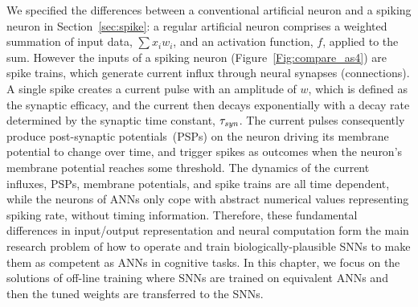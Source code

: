 	We specified the differences between a conventional artificial neuron and a spiking neuron in Section~\ref{sec:spike}: a regular artificial neuron comprises a weighted summation of input data, $\sum x_i w_i$, and an activation function, $f$, applied to the sum.
	However the inputs of a spiking neuron (Figure~\ref{Fig:compare_as4}) are spike trains, which generate current influx through neural synapses (connections).
	A single spike creates a current pulse with an amplitude of $w$, which is defined as the synaptic efficacy, and the current then decays exponentially with a decay rate determined by the synaptic time constant, $\tau_{\textit{\textrm{syn}}}$.
	The current pulses consequently produce post-synaptic potentials~(PSPs) on the neuron driving its membrane potential to change over time, and trigger spikes as outcomes when the neuron's membrane potential reaches some threshold.
	The dynamics of the current influxes, PSPs, membrane potentials, and spike trains are all time dependent, while the neurons of ANNs only cope with abstract numerical values representing spiking rate, without timing information.
	Therefore, these fundamental differences in input/output representation and neural computation form the main research problem of how to operate and train biologically-plausible SNNs to make them as competent as ANNs in cognitive tasks.
	In this chapter, we focus on the solutions of off-line training where SNNs are trained on equivalent ANNs and then the tuned weights are transferred to the SNNs.
	
